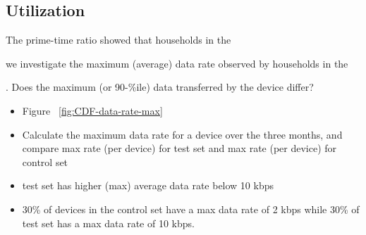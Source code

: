 \subsection{Utilization}
\label{subsec:peak-util}


The prime-time ratio showed that households in the 

we investigate the maximum (average) data rate observed by households in the 

. Does the maximum (or 90-\%ile) data transferred by the device differ?

\begin{itemize}
\itemsep0em 
\item Figure ~\ref{fig:CDF-data-rate-max}
\item Calculate the maximum data rate for a device over the three months, and compare max rate (per device) for test set and max rate (per device) for control set
\item test set has higher (max) average data rate below 10 kbps 
\item 30\% of devices in the control set have a max data rate of 2 kbps while 30\% of test set has a max data rate of 10 kbps.
\end{itemize}

